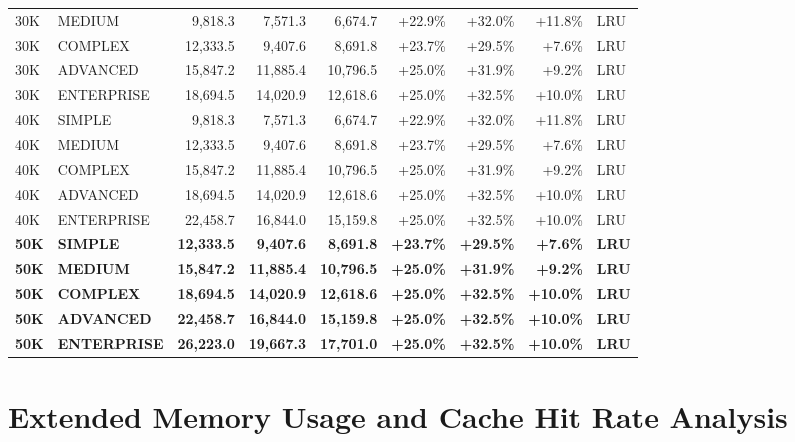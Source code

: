 \documentclass{article}
\begin{document}
\begin{longtable}{|l|l|r|r|r|r|r|r|l|}
30K & MEDIUM & 9,818.3 & 7,571.3 & 6,674.7 & +22.9\% & +32.0\% & +11.8\% & LRU \\
30K & COMPLEX & 12,333.5 & 9,407.6 & 8,691.8 & +23.7\% & +29.5\% & +7.6\% & LRU \\
30K & ADVANCED & 15,847.2 & 11,885.4 & 10,796.5 & +25.0\% & +31.9\% & +9.2\% & LRU \\
30K & ENTERPRISE & 18,694.5 & 14,020.9 & 12,618.6 & +25.0\% & +32.5\% & +10.0\% & LRU \\
40K & SIMPLE & 9,818.3 & 7,571.3 & 6,674.7 & +22.9\% & +32.0\% & +11.8\% & LRU \\
40K & MEDIUM & 12,333.5 & 9,407.6 & 8,691.8 & +23.7\% & +29.5\% & +7.6\% & LRU \\
40K & COMPLEX & 15,847.2 & 11,885.4 & 10,796.5 & +25.0\% & +31.9\% & +9.2\% & LRU \\
40K & ADVANCED & 18,694.5 & 14,020.9 & 12,618.6 & +25.0\% & +32.5\% & +10.0\% & LRU \\
40K & ENTERPRISE & 22,458.7 & 16,844.0 & 15,159.8 & +25.0\% & +32.5\% & +10.0\% & LRU \\
\textbf{50K} & \textbf{SIMPLE} & \textbf{12,333.5} & \textbf{9,407.6} & \textbf{8,691.8} & \textbf{+23.7\%} & \textbf{+29.5\%} & \textbf{+7.6\%} & \textbf{LRU} \\
\textbf{50K} & \textbf{MEDIUM} & \textbf{15,847.2} & \textbf{11,885.4} & \textbf{10,796.5} & \textbf{+25.0\%} & \textbf{+31.9\%} & \textbf{+9.2\%} & \textbf{LRU} \\
\textbf{50K} & \textbf{COMPLEX} & \textbf{18,694.5} & \textbf{14,020.9} & \textbf{12,618.6} & \textbf{+25.0\%} & \textbf{+32.5\%} & \textbf{+10.0\%} & \textbf{LRU} \\
\textbf{50K} & \textbf{ADVANCED} & \textbf{22,458.7} & \textbf{16,844.0} & \textbf{15,159.8} & \textbf{+25.0\%} & \textbf{+32.5\%} & \textbf{+10.0\%} & \textbf{LRU} \\
\textbf{50K} & \textbf{ENTERPRISE} & \textbf{26,223.0} & \textbf{19,667.3} & \textbf{17,701.0} & \textbf{+25.0\%} & \textbf{+32.5\%} & \textbf{+10.0\%} & \textbf{LRU} \\
\end{longtable}

\section{Extended Memory Usage and Cache Hit Rate Analysis}
\end{document}
